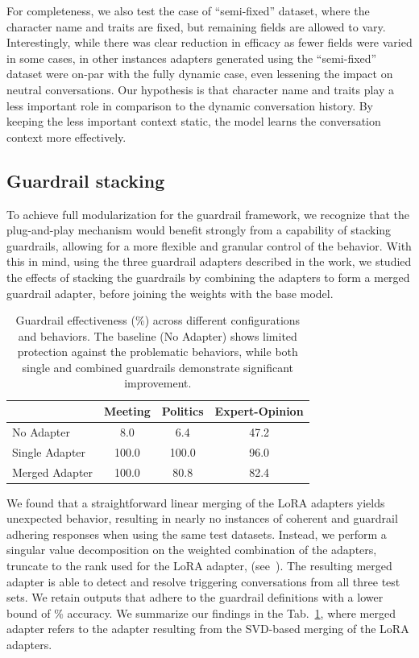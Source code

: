 \documentclass[letterpaper]{article}
\newcommand{\baselineMeeting}{8.0}
\newcommand{\baselinePolitics}{6.4}
\newcommand{\baselineExpert}{47.2}
\newcommand{\singleAdapterMeetingLora}{100.0}
\newcommand{\singleAdapterPoliticsLora}{100.0}
\newcommand{\singleAdapterExpertLora}{96.0}
\newcommand{\guardrailMergedEfficiencyMeeting}{100.0}
\newcommand{\guardrailMergedEfficiencyPolitics}{80.8}
\newcommand{\guardrailMergedEfficiencyExpert}{82.4}
\begin{document}
For completeness, we also test the case of ``semi-fixed'' dataset, where the character name and traits are fixed, but remaining fields are allowed to vary. 
Interestingly, while there was clear reduction in efficacy as fewer fields were varied in some cases, in other instances adapters generated using the ``semi-fixed'' dataset were on-par with the fully dynamic case, even lessening the impact on neutral conversations.
Our hypothesis is that character name and traits play a less important role in comparison to the dynamic conversation history. By keeping the less important context static, the model learns the conversation context more effectively.

\subsection{Guardrail stacking}
To achieve full modularization for the guardrail framework, we recognize that the plug-and-play mechanism would benefit strongly from a capability of stacking guardrails, allowing for a more flexible and granular control of the behavior. 
With this in mind, using the three guardrail adapters described in the work, we studied the effects of stacking the guardrails by combining the adapters to form a merged guardrail adapter, before joining the weights with the base model. 

\begin{table}[ht]
	\centering
	\begin{tabular}{lccc}
		\toprule
		& Meeting & Politics & Expert-Opinion \\
		\midrule
		No Adapter & \baselineMeeting& \baselinePolitics& \baselineExpert\\
		Single Adapter & \singleAdapterMeetingLora& \singleAdapterPoliticsLora& \singleAdapterExpertLora\\
		Merged Adapter & \guardrailMergedEfficiencyMeeting& \guardrailMergedEfficiencyPolitics& \guardrailMergedEfficiencyExpert\\
		\bottomrule
	\end{tabular}
	\caption{Guardrail effectiveness (\%) across different configurations and behaviors. The baseline (No Adapter) shows limited protection against the problematic behaviors, while both single and combined guardrails demonstrate significant improvement.}\label{tab:guardrail-effectiveness}
\end{table}

We found that a straightforward linear merging of the LoRA adapters yields unexpected behavior, resulting in nearly no instances of coherent and guardrail adhering responses when using the same test datasets. 
Instead, we perform a singular value decomposition on the weighted combination of the adapters, truncate to the rank used for the LoRA adapter,
(see~\cite{code}). The resulting merged adapter is able to detect and resolve triggering conversations from all three test sets. 
We retain outputs that adhere to the guardrail definitions with a lower bound of \minGuardrailMergedEfficiency\% accuracy. We summarize our findings in the Tab.~\ref{tab:guardrail-effectiveness}, where merged adapter refers to the adapter resulting from the SVD-based merging of the LoRA adapters.
\end{document}
